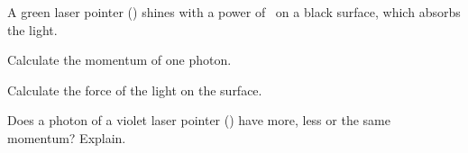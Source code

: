 A green laser pointer (\laO) shines with a power of \PgO\ on a black surface, which absorbs the light.

\begin{abcliste}
\abc Calculate the momentum of one photon.

\abc Calculate the force of the light on the surface.

\abc Does a photon of a violet laser pointer (\lbO) have more, less or the same momentum? Explain.
\end{abcliste}
